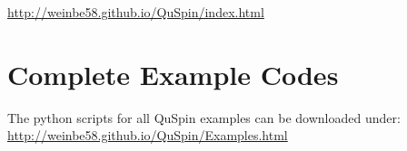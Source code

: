 \documentclass{SciPost}
\newcommand\0{\scalebox{-1}[1]{0}}
\begin{document}
\begin{appendix}
\href{http://weinbe58.github.io/QuSpin/index.html}{http://weinbe58.github.io/QuSpin/index.html}\\
	
\section{Complete Example Codes}
\label{app:scripts}
	
The python scripts for all QuSpin examples can be downloaded under:\\

\href{http://weinbe58.github.io/QuSpin/Examples.html}{http://weinbe58.github.io/QuSpin/Examples.html}\\
	
\end{appendix}


%
%

\nolinenumbers
\end{document}
